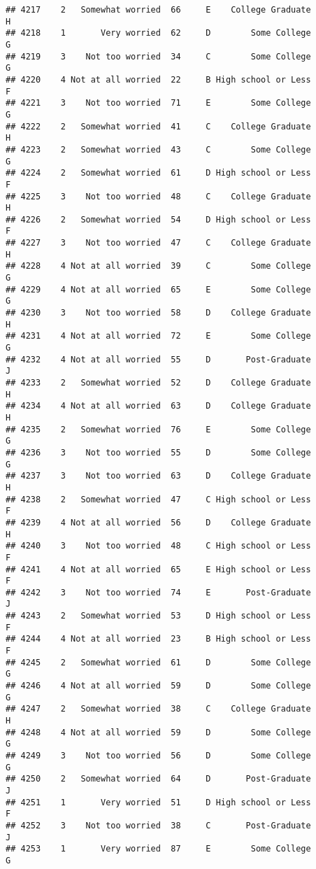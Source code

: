 \documentclass[
]{article}
\begin{document}
\begin{verbatim}
## 4217    2   Somewhat worried  66     E    College Graduate         H
## 4218    1       Very worried  62     D        Some College         G
## 4219    3    Not too worried  34     C        Some College         G
## 4220    4 Not at all worried  22     B High school or Less         F
## 4221    3    Not too worried  71     E        Some College         G
## 4222    2   Somewhat worried  41     C    College Graduate         H
## 4223    2   Somewhat worried  43     C        Some College         G
## 4224    2   Somewhat worried  61     D High school or Less         F
## 4225    3    Not too worried  48     C    College Graduate         H
## 4226    2   Somewhat worried  54     D High school or Less         F
## 4227    3    Not too worried  47     C    College Graduate         H
## 4228    4 Not at all worried  39     C        Some College         G
## 4229    4 Not at all worried  65     E        Some College         G
## 4230    3    Not too worried  58     D    College Graduate         H
## 4231    4 Not at all worried  72     E        Some College         G
## 4232    4 Not at all worried  55     D       Post-Graduate         J
## 4233    2   Somewhat worried  52     D    College Graduate         H
## 4234    4 Not at all worried  63     D    College Graduate         H
## 4235    2   Somewhat worried  76     E        Some College         G
## 4236    3    Not too worried  55     D        Some College         G
## 4237    3    Not too worried  63     D    College Graduate         H
## 4238    2   Somewhat worried  47     C High school or Less         F
## 4239    4 Not at all worried  56     D    College Graduate         H
## 4240    3    Not too worried  48     C High school or Less         F
## 4241    4 Not at all worried  65     E High school or Less         F
## 4242    3    Not too worried  74     E       Post-Graduate         J
## 4243    2   Somewhat worried  53     D High school or Less         F
## 4244    4 Not at all worried  23     B High school or Less         F
## 4245    2   Somewhat worried  61     D        Some College         G
## 4246    4 Not at all worried  59     D        Some College         G
## 4247    2   Somewhat worried  38     C    College Graduate         H
## 4248    4 Not at all worried  59     D        Some College         G
## 4249    3    Not too worried  56     D        Some College         G
## 4250    2   Somewhat worried  64     D       Post-Graduate         J
## 4251    1       Very worried  51     D High school or Less         F
## 4252    3    Not too worried  38     C       Post-Graduate         J
## 4253    1       Very worried  87     E        Some College         G

\end{verbatim}
\end{document}
